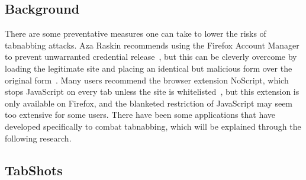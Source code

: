 \documentclass[12pt]{article}
\begin{document}
\begin{doublespace}
\section{Background}
\begin{comment}
Phishing attacks are not a new occurrence; they have been around since there has been personal data or credentials to steal. However, ``tabnabbing'' is a relatively recent addition to the list of phishing techniques, coined by Aza Raskin in 2010~\cite{Raskin}. Tabnabbing is a phishing technique that takes advantage of two commonly exhibited user behaviors for modern browser usage. The first is that users often open several tabs in a browser window and navigate between them without closing previous tabs. The second is the user tendency to leave browsers open for extended periods of time while away from their computers in order to access the pages more easily upon their return. 
\end{comment}

There are some preventative measures one can take to lower the risks of tabnabbing attacks.  Aza Raskin recommends using the Firefox Account Manager to prevent unwarranted credential release~\cite{Raskin}, but this can be cleverly overcome by loading the legitimate site and placing an identical but malicious form over the original form~\cite{NoTabNab}.  Many users recommend the browser extension NoScript, which stops JavaScript on every tab unless the site is whitelisted~\cite{NoTabNab}, but this extension is only available on Firefox, and the blanketed restriction of JavaScript may seem too extensive for some users.  There have been some applications that have developed specifically to combat tabnabbing, which will be explained through the following research.

\subsection{TabShots}
\begin{comment}
One approach to stopping tabnabbing is an extension known as TabShots, a program created by Philippe De Ryck, Nick Nikiforakis, Lieven Desmet, and Wouter Joosen~\cite{TabShots}. TabShots continuously takes screenshots of tab and compares them to the previous ones and highlights any changes in red yellow or green depending on how many changes were made. When the user navigates back to a tab that has been altered in a tabnabbing attack, they will see the highlighted portions of the screen and receive a notification that the tab has been altered. 
Performance inpact on larger screens
Relies on user to make decision
\end{comment}


\end{doublespace}
\end{document}

